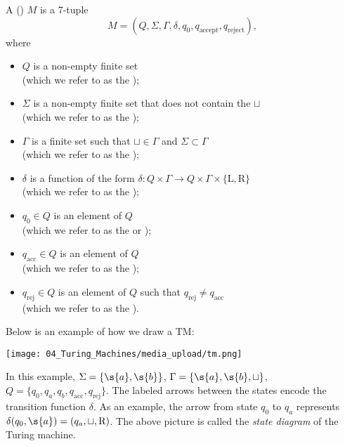 \begin{definition}
\label{definition:Turing-machine} 
A  () $M$ is a 7-tuple 
\[
M = (Q, \Sigma, \Gamma, \delta, q_0, q_\text{accept}, q_\text{reject}),
\]
where
\begin{itemize}
    \item $Q$ is a non-empty finite set \\(which we refer to as the );
    \item $\Sigma$ is a non-empty finite set that does not contain the  $\sqcup$ \\(which we refer to as the );
    \item $\Gamma$ is a finite set such that $\sqcup \in \Gamma$ and $\Sigma \subset \Gamma$ \\(which we refer to as the );
    \item $\delta$ is a function of the form $\delta: Q \times \Gamma \to Q \times \Gamma \times \{\text{L}, \text{R}\}$ \\(which we refer to as the );
    \item $q_0 \in Q$ is an element of $Q$ \\ (which we refer to as the  or );
    \item $q_\text{acc} \in Q$ is an element of $Q$ \\ (which we refer to as the );
    \item $q_\text{rej} \in Q$ is an element of $Q$ such that $q_\text{rej} \neq q_\text{acc}$ \\ (which we refer to as the ).
\end{itemize}

\end{definition}

\begin{example}[A $5$-state TM]
\label{example:A-5-state-TM}
Below is an example of how we draw a TM:
\begin{center}
    \texttt{[image: 04\_Turing\_Machines/media\_upload/tm.png]}
\end{center}
In this example, $\Sigma = \{\s{a},\s{b}\}$, $\Gamma = \{\s{a},\s{b},\sqcup\}$, $Q = \{q_0,q_a,q_b,q_\text{acc},q_\text{rej}\}$. The labeled arrows between the states encode the transition function $\delta$. As an example, the arrow from state $q_0$ to $q_a$ represents $\delta(q_0, \s{a}) = (q_a, \sqcup, \text{R})$. The above picture is called the \emph{state diagram} of the Turing machine.

\end{example}

